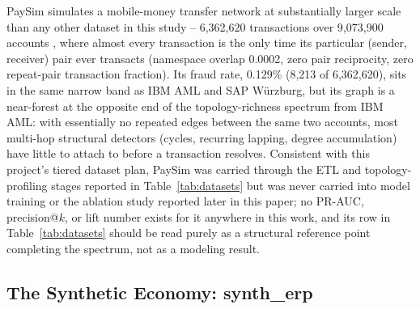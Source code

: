PaySim simulates a mobile-money transfer network at substantially larger
scale than any other dataset in this study -- 6{,}362{,}620 transactions
over 9{,}073{,}900 accounts \cite{lopezrojas2016paysim}, where almost
every transaction is the only time its particular (sender, receiver) pair
ever transacts (namespace overlap 0.0002, zero pair reciprocity, zero
repeat-pair transaction fraction). Its fraud rate, 0.129\% (8{,}213 of
6{,}362{,}620), sits in the same narrow band as IBM AML and SAP
W\"urzburg, but its graph is a near-forest at the opposite end of the
topology-richness spectrum from IBM AML: with essentially no repeated
edges between the same two accounts, most multi-hop structural detectors
(cycles, recurring lapping, degree accumulation) have little to attach to
before a transaction resolves. Consistent with this project's tiered
dataset plan, PaySim was carried through the ETL and topology-profiling
stages reported in Table~\ref{tab:datasets} but was never carried into
model training or the ablation study reported later in this paper; no
PR-AUC, precision@$k$, or lift number exists for it anywhere in this work,
and its row in Table~\ref{tab:datasets} should be read purely as a
structural reference point completing the spectrum, not as a modeling
result.

\subsection{The Synthetic Economy: synth\_erp}

